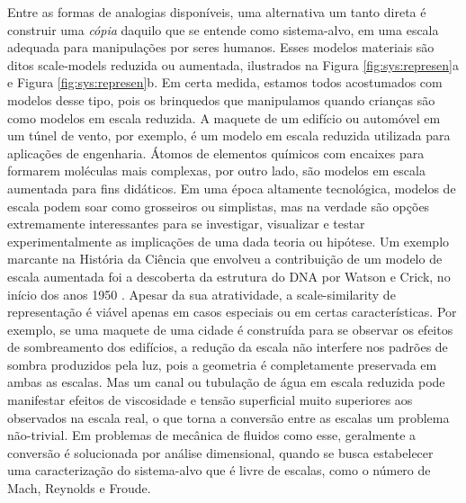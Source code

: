 \documentclass[./main.tex]{subfiles}
\begin{document}
\par Entre as formas de analogias disponíveis, uma alternativa um tanto direta é construir uma \textit{cópia} daquilo que se entende como sistema-alvo, em uma escala adequada para manipulações por seres humanos. Esses modelos materiais são ditos \gls{scale-models} reduzida ou aumentada, ilustrados na Figura \ref{fig:sys:represen}a e Figura \ref{fig:sys:represen}b. Em certa medida, estamos todos acostumados com modelos desse tipo, pois os brinquedos que manipulamos quando crianças são como modelos em escala reduzida. A maquete de um edifício ou automóvel em um túnel de vento, por exemplo, é um modelo em escala reduzida utilizada para aplicações de engenharia. Átomos de elementos químicos com encaixes para formarem moléculas mais complexas, por outro lado, são modelos em escala aumentada para fins didáticos. Em uma época altamente tecnológica, modelos de escala podem soar como grosseiros ou simplistas, mas na verdade são opções extremamente interessantes para se investigar, visualizar e testar experimentalmente as implicações de uma dada teoria ou hipótese. Um exemplo marcante na História da Ciência que envolveu a contribuição de um modelo de escala aumentada foi a descoberta da estrutura do DNA por Watson e Crick, no início dos anos 1950 \cite{deChadarevian2003}. Apesar da sua atratividade, a \gls{scale-similarity} de representação é viável apenas em casos especiais ou em certas características. Por exemplo, se uma maquete de uma cidade é construída para se observar os efeitos de sombreamento dos edifícios, a redução da escala não interfere nos padrões de sombra produzidos pela luz, pois a geometria é completamente preservada em ambas as escalas. Mas um canal ou tubulação de água em escala reduzida pode manifestar efeitos de viscosidade e tensão superficial muito superiores aos observados na escala real, o que torna a conversão entre as escalas um problema não-trivial. Em problemas de mecânica de fluidos como esse, geralmente a conversão é solucionada por análise dimensional, quando se busca estabelecer uma caracterização do sistema-alvo que é livre de escalas, como o número de Mach, Reynolds e Froude.
\end{document}

